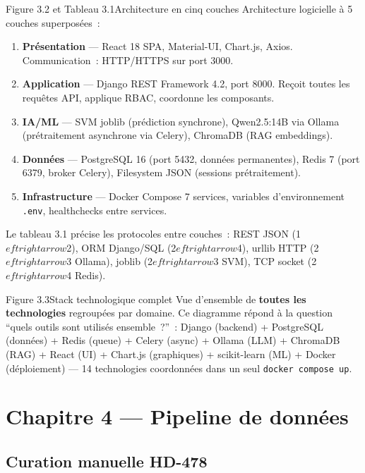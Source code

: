 \documentclass[12pt,a4paper]{article}
\begin{document}
\begin{figbox}{Figure 3.2 et Tableau 3.1}{Architecture en cinq couches}
Architecture logicielle à 5 couches superposées~:
\begin{enumerate}[leftmargin=2em, itemsep=2pt]
  \item \textbf{Présentation} --- React 18 SPA, Material-UI, Chart.js, Axios.
    Communication~: HTTP/HTTPS sur port 3000.
  \item \textbf{Application} --- Django REST Framework 4.2, port 8000.
    Reçoit toutes les requêtes API, applique RBAC, coordonne les composants.
  \item \textbf{IA/ML} --- SVM joblib (prédiction synchrone), Qwen2.5:14B via
    Ollama (prétraitement asynchrone via Celery), ChromaDB (RAG embeddings).
  \item \textbf{Données} --- PostgreSQL 16 (port 5432, données permanentes),
    Redis 7 (port 6379, broker Celery), Filesystem JSON (sessions prétraitement).
  \item \textbf{Infrastructure} --- Docker Compose 7 services,
    variables d'environnement \texttt{.env}, healthchecks entre services.
\end{enumerate}
Le tableau 3.1 précise les protocoles entre couches~: REST JSON (1$eftrightarrow$2),
ORM Django/SQL (2$eftrightarrow$4), urllib HTTP (2$eftrightarrow$3 Ollama), joblib (2$eftrightarrow$3 SVM),
TCP socket (2$eftrightarrow$4 Redis).
\end{figbox}

\begin{figbox}{Figure 3.3}{Stack technologique complet}
Vue d'ensemble de \textbf{toutes les technologies} regroupées par domaine.
Ce diagramme répond à la question ``quels outils sont utilisés ensemble~?''~:
Django (backend) + PostgreSQL (données) + Redis (queue) + Celery (async) +
Ollama (LLM) + ChromaDB (RAG) + React (UI) + Chart.js (graphiques) +
scikit-learn (ML) + Docker (déploiement) --- 14 technologies coordonnées dans
un seul \texttt{docker compose up}.
\end{figbox}

\section{Chapitre 4 --- Pipeline de données}

\subsection{Curation manuelle HD-478}
\end{document}
